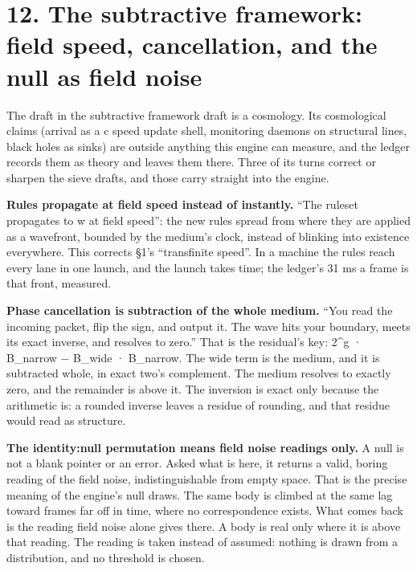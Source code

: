 \section{\texorpdfstring{12. The subtractive framework: field speed, cancellation, and the null as field noise}{12. The subtractive framework: field speed, cancellation, and the null as field noise}}

The draft in the subtractive framework draft is a cosmology. Its cosmological claims (arrival as a c speed update shell, monitoring daemons on structural lines, black holes as sinks) are outside anything this engine can measure, and the ledger records them as theory and leaves them there. Three of its turns correct or sharpen the sieve drafts, and those carry straight into the engine.

\textbf{Rules propagate at field speed instead of instantly.} “The ruleset propagates to w at field speed”: the new rules spread from where they are applied as a wavefront, bounded by the medium's clock, instead of blinking into existence everywhere. This corrects §1's “transfinite speed”. In a machine the rules reach every lane in one launch, and the launch takes time; the ledger's 31 ms a frame is that front, measured.

\textbf{Phase cancellation is subtraction of the whole medium.} “You read the incoming packet, flip the sign, and output it. The wave hits your boundary, meets its exact inverse, and resolves to zero.” That is the residual's key: 2\textasciicircum{}g · B\_\allowbreak{}narrow − B\_\allowbreak{}wide · B\_\allowbreak{}narrow. The wide term is the medium, and it is subtracted whole, in exact two's complement. The medium resolves to exactly zero, and the remainder is above it. The inversion is exact only because the arithmetic is: a rounded inverse leaves a residue of rounding, and that residue would read as structure.

\textbf{The identity:null permutation means field noise readings only.} A null is not a blank pointer or an error. Asked what is here, it returns a valid, boring reading of the field noise, indistinguishable from empty space. That is the precise meaning of the engine's null draws. The same body is climbed at the same lag toward frames far off in time, where no correspondence exists. What comes back is the reading field noise alone gives there. A body is real only where it is above that reading. The reading is taken instead of assumed: nothing is drawn from a distribution, and no threshold is chosen.


